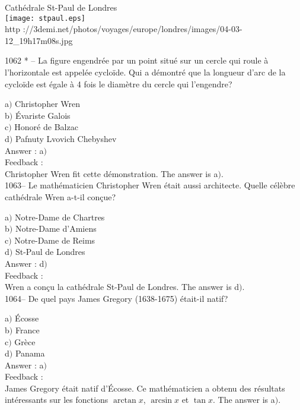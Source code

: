 \documentclass[letterpaper, 12pt]{article}
\begin{document}
        \begin{center}
        Cath\'edrale St-Paul de Londres\\
    \texttt{[image: stpaul.eps]}\\
        {\footnotesize http
://3demi.net/photos/voyages/europe/londres/images/04-03-12\_19h17m08s.jpg}
    \end{center}

1062 * -- La figure engendr\'ee par un point situ\'e sur un cercle
qui roule \`a l'horizontale est appel\'ee cyclo\"ide. Qui a
d\'emontr\'e que la longueur d'arc de la cyclo\"ide est \'egale \`a
4 fois le diam\`etre du cercle qui l'engendre?

a$)$ Christopher Wren\\
b$)$ \'Evariste Galois \\
c$)$ Honor\'e de Balzac \\
d$)$ Pafnuty Lvovich Chebyshev\\

Answer : a$)$\\

Feedback : \\
Christopher Wren fit cette d\'emonstration.
The answer is a$)$.\\

1063-- Le math\'ematicien Christopher Wren \'etait aussi architecte.
Quelle c\'el\`ebre cath\'edrale Wren a-t-il con\c cue?

a$)$ Notre-Dame de Chartres  \\
b$)$ Notre-Dame d'Amiens \\
c$)$ Notre-Dame de Reims \\
d$)$ St-Paul de Londres \\

Answer : d$)$\\

Feedback : \\
Wren a con\c cu la cath\'edrale St-Paul de Londres.
The answer is d$)$.\\

1064-- De quel pays James Gregory (1638-1675) \'etait-il natif?

a$)$ \'Ecosse \\
b$)$ France  \\
c$)$ Gr\`ece  \\
d$)$ Panama \\

Answer : a$)$ \\

Feedback : \\
James Gregory \'etait natif d'\'Ecosse. Ce math\'ematicien a obtenu
des r\'esultats int\'eressants sur les fonctions $\arctan x$,
$\arcsin x$ et $\tan x$.
The answer is a$)$.\\
\end{document}
